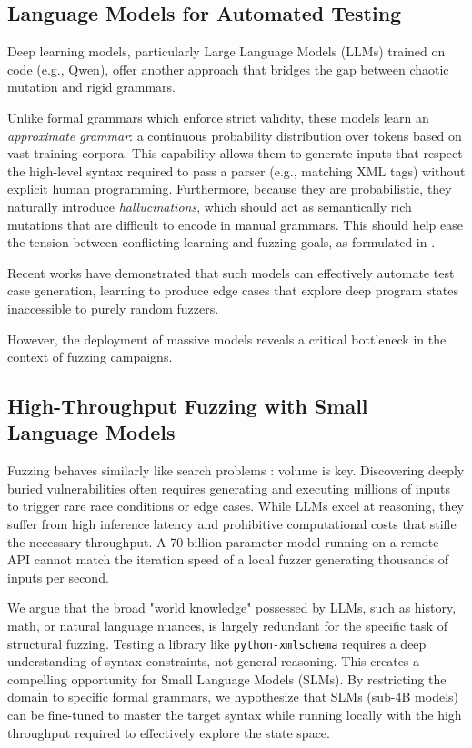 \documentclass[11pt]{article}
\begin{document}
\subsection{Language Models for Automated Testing}

Deep learning models, particularly Large Language Models (LLMs) trained on code (e.g., Qwen), offer another approach that bridges the gap between chaotic mutation and rigid grammars.

Unlike formal grammars which enforce strict validity, these models learn an \textit{approximate grammar}: a continuous probability distribution over tokens based on vast training corpora. This capability allows them to generate inputs that respect the high-level syntax required to pass a parser (e.g., matching XML tags) without explicit human programming. Furthermore, because they are probabilistic, they naturally introduce \textit{hallucinations}, which should act as semantically rich mutations that are difficult to encode in manual grammars. This should help ease the tension between conflicting learning and fuzzing goals, as formulated in \cite{godefroid2017learnfuzzmachinelearninginput}.

Recent works \cite{deng2023largelanguagemodelszeroshot} \cite{Xia_2024} have demonstrated that such models can effectively automate test case generation, learning to produce edge cases that explore deep program states inaccessible to purely random fuzzers.

However, the deployment of massive models reveals a critical bottleneck in the context of fuzzing campaigns.

\subsection{High-Throughput Fuzzing with Small Language Models} Fuzzing behaves similarly like search problems \cite{10.1007/978-3-032-09524-4_1}: volume is key. Discovering deeply buried vulnerabilities often requires generating and executing millions of inputs to trigger rare race conditions or edge cases. While LLMs excel at reasoning, they suffer from high inference latency and prohibitive computational costs that stifle the necessary throughput. A 70-billion parameter model running on a remote API cannot match the iteration speed of a local fuzzer generating thousands of inputs per second.

We argue that the broad "world knowledge" possessed by LLMs, such as history, math, or natural language nuances, is largely redundant for the specific task of structural fuzzing. Testing a library like \texttt{python-xmlschema} requires a deep understanding of syntax constraints, not general reasoning. This creates a compelling opportunity for Small Language Models (SLMs). By restricting the domain to specific formal grammars, we hypothesize that SLMs (sub-4B models) can be fine-tuned to master the target syntax while running locally with the high throughput required to effectively explore the state space.
\end{document}
